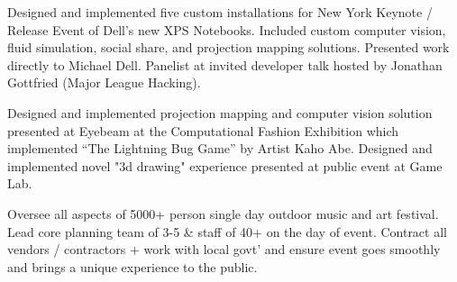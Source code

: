 \documentclass[]{deedy-resume-openfont}
\begin{document}
\begin{minipage}[t]{0.58\textwidth}
\vspace{\topsep} %
Designed and implemented five custom installations for New York Keynote / Release Event of Dell’s new XPS Notebooks. Included custom computer vision, fluid simulation, social share, and projection mapping solutions. Presented work directly to Michael Dell. Panelist at invited developer talk hosted by Jonathan Gottfried (Major League Hacking).
\sectionseplg



Designed and implemented projection mapping and computer vision solution presented at Eyebeam at the Computational Fashion Exhibition which implemented “The Lightning Bug Game” by Artist Kaho Abe. Designed and implemented novel "3d drawing" experience presented at public event at  Game Lab. 
\sectionseplg





 \newline

\vspace{\topsep} %
Oversee all aspects of 5000+ person single day outdoor music and art festival. Lead core planning team of 3-5 \& staff of 40+ on the day of event. Contract all vendors / contractors + work with local govt' and ensure event goes smoothly and brings a unique experience to the public.
\sectionseplg


\end{minipage}
\end{document}
